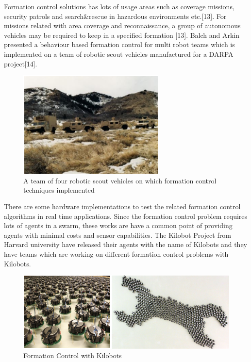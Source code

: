 Formation control solutions has lots of usage areas such as coverage missions, security patrols and search$\&$rescue in hazardous environments etc.[13]. For missions related with area coverage and reconnaissance, a group of autonomous vehicles may be required to keep in a specified formation [13].  Balch and Arkin presented a behaviour based formation control for multi robot teams which is implemented on a team of robotic scout vehicles manufactured for a DARPA project[14]. 


\begin{figure}[H]
	\caption{A team of four robotic scout vehicles on which formation control techniques implemented}
	\centering
	\includegraphics[scale = 1]{scout_robots}
\end{figure} 

There are some hardware implementations to test the related formation control algorithms in real time applications. Since the formation control problem requires lots of agents in a swarm, these works are have a common point of providing agents with minimal costs and sensor capabilities. The Kilobot Project from Harvard university have released their agents with the name of Kilobots and they have teams which are working on different formation control problems with Kilobots.


	\begin{figure}[H]
		\caption{Formation Control with Kilobots}
		\centering
		\includegraphics[scale = 1]{kilobot}
	\end{figure} 


